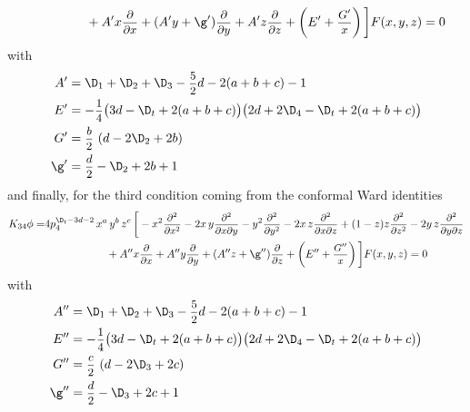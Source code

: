 \documentclass[a4paper,11pt,openright,twoside]{book}
\newcommand{\sdfrac}[2]{\mbox{\small$\displaystyle\frac{#1}{#2}$}}
\numberwithin{equation}{section}
\begin{document}
{{\begin{align}
		&\hspace{2cm}+A'x\sdfrac{\partial}{\partial x}+(A'y+\g')\sdfrac{\partial}{\partial y}+A'z\sdfrac{\partial }{\partial z}+\left(E'+\sdfrac{G'}{x}\right)\bigg]F(x,y,z)=0
	\end{align}
	with
	\begin{subequations}
		\begin{align}
			A'&=\D_1+\D_2+\D_3-\sdfrac{5}{2}d-2(a+b+c)-1\\
			E'&=-\sdfrac{1}{4}\big(3d-\D_t+2(a+b+c)\big)\big(2d+2\D_4-\D_t+2(a+b+c)\big)\\
			G'&=\sdfrac{b}{2}\,\left(d-2\D_2+2b\right)\\
			\g'&=\sdfrac{d}{2}-\D_2+2b+1
		\end{align}
	\end{subequations}
	and finally, for the third condition coming from the conformal Ward identities
	\begin{align}
		{K}_{34}\phi=&4p_4^{\D_t-3d-2}\,x^a\,y^b\,z^c\,\bigg[-x^2\sdfrac{\partial^2}{\partial x^2}-2x\,y\sdfrac{\partial^2}{\partial x\partial y}-y^2\sdfrac{\partial^2}{\partial y^2}-2x\,z\sdfrac{\partial^2}{\partial x\partial z}+(1-z)z\sdfrac{\partial^2}{\partial z^2}-2y\,z\sdfrac{\partial^2}{\partial y\partial z}\notag\\
		&\hspace{2cm}+A''x\sdfrac{\partial}{\partial x}+A''y\sdfrac{\partial}{\partial y}+(A''z+\g'')\sdfrac{\partial }{\partial z}+\left(E''+\sdfrac{G''}{x}\right)\bigg]F(x,y,z)=0
	\end{align}
	with
	\begin{subequations}
		\begin{align}
			A''&=\D_1+\D_2+\D_3-\sdfrac{5}{2}d-2(a+b+c)-1\\
			E''&=-\sdfrac{1}{4}\big(3d-\D_t+2(a+b+c)\big)\big(2d+2\D_4-\D_t+2(a+b+c)\big)\\
			G''&=\sdfrac{c}{2}\,\left(d-2\D_3+2c\right)\\
			\g''&=\sdfrac{d}{2}-\D_3+2c+1
		\end{align}
	\end{subequations}
	
}}
\end{document}
